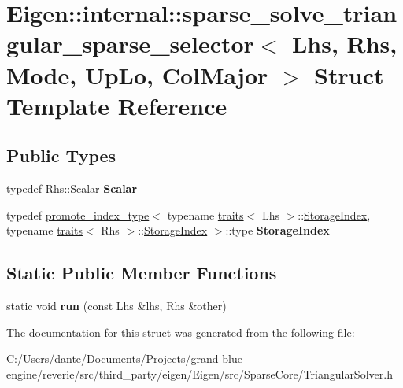 \hypertarget{struct_eigen_1_1internal_1_1sparse__solve__triangular__sparse__selector_3_01_lhs_00_01_rhs_00_0103d70089ab1c1a5e4529163773532981}{}\section{Eigen\+::internal\+::sparse\+\_\+solve\+\_\+triangular\+\_\+sparse\+\_\+selector$<$ Lhs, Rhs, Mode, Up\+Lo, Col\+Major $>$ Struct Template Reference}
\label{struct_eigen_1_1internal_1_1sparse__solve__triangular__sparse__selector_3_01_lhs_00_01_rhs_00_0103d70089ab1c1a5e4529163773532981}
\subsection*{Public Types}
\begin{DoxyCompactItemize}
\item 
\mbox{\label{struct_eigen_1_1internal_1_1sparse__solve__triangular__sparse__selector_3_01_lhs_00_01_rhs_00_0103d70089ab1c1a5e4529163773532981_a4f0d0f5c5568306a874f992dbbe24ae6}} 
typedef Rhs\+::\+Scalar {\bfseries Scalar}
\item 
\mbox{\label{struct_eigen_1_1internal_1_1sparse__solve__triangular__sparse__selector_3_01_lhs_00_01_rhs_00_0103d70089ab1c1a5e4529163773532981_a0e4e8b7d3e2c86587b1bc32021966ecf}} 
typedef \mbox{\hyperlink{struct_eigen_1_1internal_1_1promote__index__type}{promote\+\_\+index\+\_\+type}}$<$ typename \mbox{\hyperlink{struct_eigen_1_1internal_1_1traits}{traits}}$<$ Lhs $>$\+::\mbox{\hyperlink{struct_eigen_1_1internal_1_1conditional}{Storage\+Index}}, typename \mbox{\hyperlink{struct_eigen_1_1internal_1_1traits}{traits}}$<$ Rhs $>$\+::\mbox{\hyperlink{struct_eigen_1_1internal_1_1conditional}{Storage\+Index}} $>$\+::type {\bfseries Storage\+Index}
\end{DoxyCompactItemize}
\subsection*{Static Public Member Functions}
\begin{DoxyCompactItemize}
\item 
\mbox{\label{struct_eigen_1_1internal_1_1sparse__solve__triangular__sparse__selector_3_01_lhs_00_01_rhs_00_0103d70089ab1c1a5e4529163773532981_afaf80269f4b56b9a0b974fc2826a73cc}} 
static void {\bfseries run} (const Lhs \&lhs, Rhs \&other)
\end{DoxyCompactItemize}


The documentation for this struct was generated from the following file\+:\begin{DoxyCompactItemize}
\item 
C\+:/\+Users/dante/\+Documents/\+Projects/grand-\/blue-\/engine/reverie/src/third\+\_\+party/eigen/\+Eigen/src/\+Sparse\+Core/Triangular\+Solver.\+h\end{DoxyCompactItemize}
